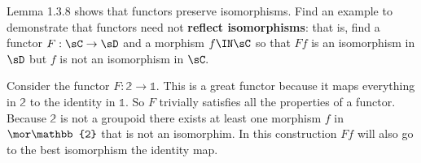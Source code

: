 \documentclass[main.tex]{subfiles}
\begin{document}
\begin{exercise}
	Lemma 1.3.8 shows that functors preserve isomorphisms. Find an example to
	demonstrate that functors need not \textbf{reflect isomorphisms}: that is,
	find a functor $ F:\sC\to\sD $ and a morphism $ f\IN\sC $ so that $ Ff $ is
	an isomorphism in $ \sD $ but $ f $ is not an isomorphism in $ \sC. $
\end{exercise}


Consider the functor $ F: \mathbb{2}\to \mathbb{1}.$ This is a great functor
because it maps everything in $\mathbb{2}$ to the identity in $ \mathbb{1}. $ So
$ F $ trivially satisfies all the properties of a functor. Because $ \mathbb{2}
$ is not a groupoid there exists at least one morphism $ f $ in $\mor \mathbb{2}
$ that is not an isomorphim. In this construction $ Ff $ will also go to the
best isomorphism the identity map.
\end{document}

